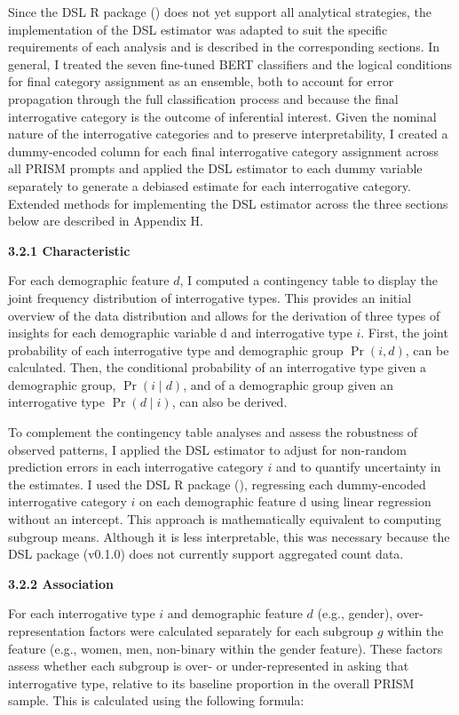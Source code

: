 \documentclass[
  12pt,
]{article}
\begin{document}
Since the DSL R package () does not yet support all analytical strategies, the implementation of the DSL estimator was adapted to suit the specific requirements of each analysis and is described in the corresponding sections. In general, I treated the seven fine-tuned BERT classifiers and the logical conditions for final category assignment as an ensemble, both to account for error propagation through the full classification process and because the final interrogative category is the outcome of inferential interest. Given the nominal nature of the interrogative categories and to preserve interpretability, I created a dummy-encoded column for each final interrogative category assignment across all PRISM prompts and applied the DSL estimator to each dummy variable separately to generate a debiased estimate for each interrogative category. Extended methods for implementing the DSL estimator across the three sections below are described in Appendix H.

\textbf{3.2.1 Characteristic}

For each demographic feature \(d\), I computed a contingency table to display the joint frequency distribution of interrogative types. This provides an initial overview of the data distribution and allows for the derivation of three types of insights for each demographic variable d and interrogative type \(i\). First, the joint probability of each interrogative type and demographic group \(\Pr(i, d)\), can be calculated. Then, the conditional probability of an interrogative type given a demographic group, \(\Pr(i \mid d)\), and of a demographic group given an interrogative type \(\Pr(d \mid i)\), can also be derived.

To complement the contingency table analyses and assess the robustness of observed patterns, I applied the DSL estimator to adjust for non-random prediction errors in each interrogative category \(i\) and to quantify uncertainty in the estimates. I used the DSL R package (), regressing each dummy-encoded interrogative category \(i\) on each demographic feature d using linear regression without an intercept. This approach is mathematically equivalent to computing subgroup means. Although it is less interpretable, this was necessary because the DSL package (v0.1.0) does not currently support aggregated count data.

\textbf{3.2.2 Association}

For each interrogative type \(i\) and demographic feature \(d\) (e.g., gender), over-representation factors were calculated separately for each subgroup \(g\) within the feature (e.g., women, men, non-binary within the gender feature). These factors assess whether each subgroup is over- or under-represented in asking that interrogative type, relative to its baseline proportion in the overall PRISM sample. This is calculated using the following formula:
\end{document}
